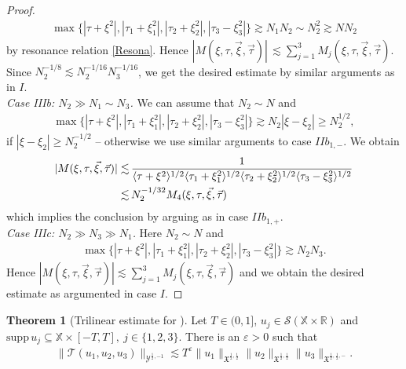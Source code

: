 \documentclass[reqno]{amsart}
\theoremstyle{Definitionl}
\theoremstyle{Definitionk}
\theoremstyle{definition}
\theoremstyle{Satzk}
\theoremstyle{Satzl}
\newtheorem{satzl}[defi]{Theorem}
\theoremstyle{Bemerkung}
\begin{document}
\begin{proof}
\begin{align*}
\max\{|\tau+\xi^2|,|\tau_1+\xi_1^2|,|\tau_2+\xi_2^2|,|\tau_3-\xi_3^2|\}
\gtrsim N_1N_2\sim N_2^2\gtrsim NN_2
\end{align*}
by resonance relation \eqref{Resona}. Hence $|M(\xi,\tau,\vec\xi,\vec\tau)|\,\lesssim  \sum_{j=1}^3M_j(\xi,\tau,\vec\xi,\vec\tau)$. Since $N_2^{-1/8}\lesssim N_2^{-1/16}N_3^{-1/16}$, we get the desired estimate by similar arguments as in $I$.\\[10pt]
\emph{Case IIIb: $N_2\gg N_1\sim N_3$. }We can assume that $N_2\sim N$ and
\begin{align*}
\max\{|\tau+\xi^2|,|\tau_1+\xi_1^2|,|\tau_2+\xi_2^2|,|\tau_3-\xi_3^2|\}\gtrsim N_2|\xi-\xi_2|\ge N_2^{1/2},
\end{align*}
if $|\xi-\xi_2|\ge N_2^{-1/2}$ -- otherwise we use similar arguments to case $IIb_{1,-}$. We obtain
\begin{align*}
|M(\xi,\tau,\vec\xi,\vec\tau)|\lesssim&\, \frac{1}{\langle\tau+\xi^2\rangle^{1/2}\langle\tau_1+\xi_1^2\rangle^{1/2}\langle\tau_2+\xi_2^2\rangle^{1/2}\langle\tau_3-\xi_3^2\rangle^{1/2}}\nonumber\allowdisplaybreaks[1]\\
\lesssim&\, N_2^{-1/32}M_4(\xi,\tau,\vec\xi,\vec\tau)
\end{align*}
which implies the conclusion by arguing as in case $IIb_{1,+}$.\\[10pt]
\emph{Case IIIc: $N_2\gg N_3\gg N_1$. }Here $N_2\sim N$ and 
\begin{align*}
\max\{|\tau+\xi^2|,|\tau_1+\xi_1^2|,|\tau_2+\xi_2^2|,|\tau_3-\xi_3^2|\}\gtrsim N_2N_3.
\end{align*}
Hence $|M(\xi,\tau,\vec\xi,\vec\tau)|\lesssim \sum_{j=1}^3M_j(\xi,\tau,\vec\xi,\vec\tau)$ and we obtain the desired estimate as argumented in case $I$.
\end{proof}
\begin{satzl}[Trilinear estimate for \unboldmath{}]\label{Tri}
Let $T\in(0,1]$, $u_j\in\mathcal S(\mathbb X\times\mathbb R)$ and $\mathrm{supp}\,u_j\subseteq\mathbb X\times[-T,T],\ j\in\{1,2,3\}$. There is an $\varepsilon>0$ such that
\begin{align}
\|\mathcal T(u_1,u_2,u_3)\|_{\mathcal Y^{\frac12,-1}}\lesssim T^\varepsilon\|u_1\|_{\mathfrak X^{\frac12,\frac12}}\|u_2\|_{\mathfrak X^{\frac12,\frac12}}\|u_3\|_{\mathfrak X^{\frac12,\frac12,-}}.\label{TY}
\end{align}
\end{satzl}
\end{document}
